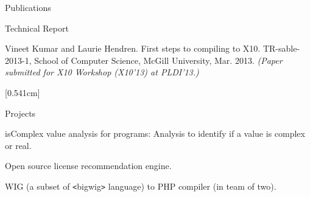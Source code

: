 \documentclass{resume} %
\begin{document}
\begin{rSection}{Publications}
\begin{rSubsection}{Technical Report}{}{}{}
\item Vineet Kumar and Laurie Hendren. First steps to compiling \matlab to \textsc{X10}.
TR-sable-2013-1, School of Computer Science, McGill University, Mar. 2013.
\em{(Paper submitted for X10 Workshop (X10'13) at PLDI'13.)}
\end{rSubsection}
\end{rSection}
\newpage
[0.541cm]
\begin{rSection}{Projects}
\smallskip
\begin{lSubsection}
    \item isComplex value analysis for \matlab programs: Analysis to identify if a value is complex or real. 
    \item Open source license recommendation engine.
    \item WIG (a subset of \verb+<+bigwig\verb+>+ language) to PHP compiler (in team of two).
\end{lSubsection}
\end{rSection}

\end{document}
